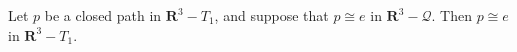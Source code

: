 Let $p$ be a closed path in $\mathbf{R}^3 - T_1$, and suppose that $p \cong e$ in $\mathbf{R}^3 - \mathcal{Q}$. Then $p \cong e$ in $\mathbf{R}^3 - T_1$.
